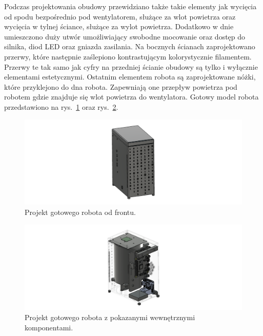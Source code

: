 Podczas projektowania obudowy przewidziano także takie elementy jak wycięcia od spodu bezpośrednio pod wentylatorem, służące za wlot powietrza
oraz wycięcia w tylnej ściance, służące za wylot powietrza. Dodatkowo w dnie umieszczono duży utwór umożliwiający swobodne mocowanie oraz dostęp do
silnika, diod LED oraz gniazda zasilania. Na bocznych ścianach zaprojektowano przerwy, które następnie zaślepiono kontrastującym kolorystycznie filamentem.
Przerwy te tak samo jak cyfry na przedniej ścianie obudowy są tylko i wyłącznie elementami estetycznymi. Ostatnim elementem robota są zaprojektowane nóżki,
które przyklejono do dna robota. Zapewniają one przepływ powietrza pod robotem gdzie znajduje się wlot powietrza do wentylatora. Gotowy model robota przedstawiono
na rys.~\ref{fig:gotowy} oraz rys.~\ref{fig:srodek}.

\begin{figure}[H]
    \centering
    \includegraphics[width=0.95\linewidth]{chapters/03-praca-wlasna/figures/gotowy2}
    \caption{\label{fig:gotowy}Projekt gotowego robota od frontu.}
\end{figure}

\begin{figure}[H]
    \centering
    \includegraphics[width=0.95\linewidth]{chapters/03-praca-wlasna/figures/gotowy w srodku}
    \caption{\label{fig:srodek}Projekt gotowego robota z pokazanymi wewnętrznymi komponentami.}
\end{figure}